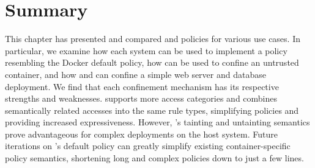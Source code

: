 \section{Summary}

This chapter has presented and compared \bpfbox{} and \bpfcontain{} policies for various
use cases. In particular, we examine how each system can be used to implement a policy
resembling the Docker default policy, how \bpfcontain{} can be used to confine an
untrusted container, and how \bpfbox{} and \bpfcontain{} can confine a simple web server
and database deployment. We find that each confinement mechanism has its respective
strengths and weaknesses.  \bpfcontain{} supports more access categories and combines
semantically related accesses into the same rule types, simplifying policies and providing
increased expressiveness. However, \bpfbox{}'s tainting and untainting semantics prove
advantageous for complex deployments on the host system. Future iterations on
\bpfcontain{}'s default policy can greatly simplify existing container-specific policy
semantics, shortening long and complex policies down to just a few lines.
